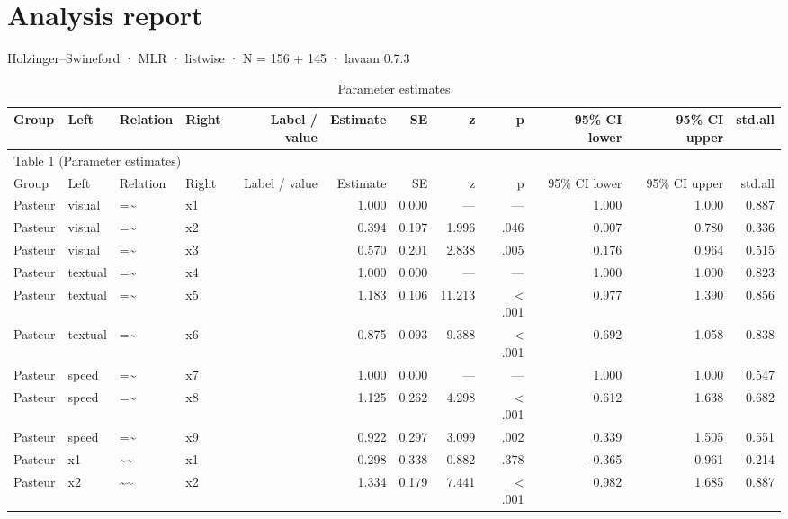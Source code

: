 \documentclass[11pt]{article}
\begin{document}
\section*{Analysis report}
Holzinger–Swineford · MLR · listwise · N = 156 + 145 · lavaan 0.7.3\par

\begin{landscape}
\small
\begin{longtable}{llllrrrrrrrr}
\caption{Parameter estimates}\\
\toprule
Group & Left & Relation & Right & Label / value & Estimate & SE & z & p & 95\% CI lower & 95\% CI upper & std.all \\
\midrule
\endfirsthead
\multicolumn{12}{l}{Table 1 (Parameter estimates)} \\
\toprule
Group & Left & Relation & Right & Label / value & Estimate & SE & z & p & 95\% CI lower & 95\% CI upper & std.all \\
\midrule
\endhead
Pasteur & visual & =\textasciitilde{} & x1 &  & 1.000 & 0.000 & — & — & 1.000 & 1.000 & 0.887 \\
Pasteur & visual & =\textasciitilde{} & x2 &  & 0.394 & 0.197 & 1.996 & .046 & 0.007 & 0.780 & 0.336 \\
Pasteur & visual & =\textasciitilde{} & x3 &  & 0.570 & 0.201 & 2.838 & .005 & 0.176 & 0.964 & 0.515 \\
Pasteur & textual & =\textasciitilde{} & x4 &  & 1.000 & 0.000 & — & — & 1.000 & 1.000 & 0.823 \\
Pasteur & textual & =\textasciitilde{} & x5 &  & 1.183 & 0.106 & 11.213 & < .001 & 0.977 & 1.390 & 0.856 \\
Pasteur & textual & =\textasciitilde{} & x6 &  & 0.875 & 0.093 & 9.388 & < .001 & 0.692 & 1.058 & 0.838 \\
Pasteur & speed & =\textasciitilde{} & x7 &  & 1.000 & 0.000 & — & — & 1.000 & 1.000 & 0.547 \\
Pasteur & speed & =\textasciitilde{} & x8 &  & 1.125 & 0.262 & 4.298 & < .001 & 0.612 & 1.638 & 0.682 \\
Pasteur & speed & =\textasciitilde{} & x9 &  & 0.922 & 0.297 & 3.099 & .002 & 0.339 & 1.505 & 0.551 \\
Pasteur & x1 & \textasciitilde{}\textasciitilde{} & x1 &  & 0.298 & 0.338 & 0.882 & .378 & -0.365 & 0.961 & 0.214 \\
Pasteur & x2 & \textasciitilde{}\textasciitilde{} & x2 &  & 1.334 & 0.179 & 7.441 & < .001 & 0.982 & 1.685 & 0.887 \\

\end{longtable}
\end{landscape}
\end{document}
